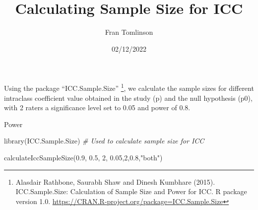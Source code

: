 \documentclass[
]{article}
\title{Calculating Sample Size for ICC}
\author{Fran Tomlinson}
\date{02/12/2022}
\newenvironment{Shaded}{\begin{snugshade}}{\end{snugshade}}
\newcommand{\CommentTok}[1]{\textcolor[rgb]{0.56,0.35,0.01}{\textit{#1}}}
\newcommand{\DecValTok}[1]{\textcolor[rgb]{0.00,0.00,0.81}{#1}}
\newcommand{\FloatTok}[1]{\textcolor[rgb]{0.00,0.00,0.81}{#1}}
\newcommand{\FunctionTok}[1]{\textcolor[rgb]{0.00,0.00,0.00}{#1}}
\newcommand{\NormalTok}[1]{#1}
\newcommand{\StringTok}[1]{\textcolor[rgb]{0.31,0.60,0.02}{#1}}
\begin{document}
\maketitle

Using the package ``ICC.Sample.Size'' \footnote{Alasdair Rathbone,
  Saurabh Shaw and Dinesh Kumbhare (2015). ICC.Sample.Size: Calculation
  of Sample Size and Power for ICC. R package version 1.0.
  \url{https://CRAN.R-project.org/package=ICC.Sample.Size}}, we
calculate the sample sizes for different intraclass coefficient value
obtained in the study (p) and the null hypothesis (p0), with 2 raters a
significance level set to 0.05 and power of 0.8.

Power

\begin{Shaded}
\begin{Highlighting}[]
\FunctionTok{library}\NormalTok{(ICC.Sample.Size) }\CommentTok{\# Used to calculate sample size for ICC}

\FunctionTok{calculateIccSampleSize}\NormalTok{(}\FloatTok{0.9}\NormalTok{, }\FloatTok{0.5}\NormalTok{, }\DecValTok{2}\NormalTok{, }\FloatTok{0.05}\NormalTok{,}\DecValTok{2}\NormalTok{,}\FloatTok{0.8}\NormalTok{,}\StringTok{"both"}\NormalTok{)}
\end{Highlighting}
\end{Shaded}
\end{document}
